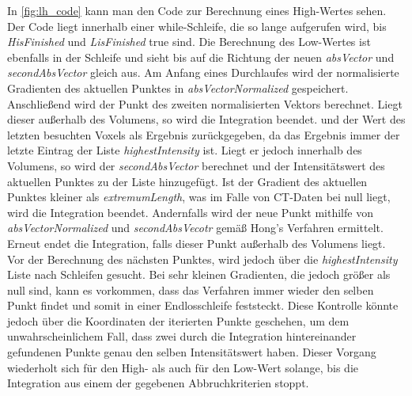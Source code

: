 In \autoref{fig:lh_code} kann man den Code zur Berechnung eines High-Wertes sehen. Der Code liegt innerhalb einer while-Schleife, die so lange aufgerufen wird, bis \textit{HisFinished} und \textit{LisFinished} true sind. Die Berechnung des Low-Wertes ist ebenfalls in der Schleife und sieht bis auf die Richtung der neuen \textit{absVector} und \textit{secondAbsVector} gleich aus.
\newline
Am Anfang eines Durchlaufes wird der normalisierte Gradienten des aktuellen Punktes in \textit{absVectorNormalized} gespeichert. Anschließend wird der Punkt des zweiten normalisierten Vektors berechnet. Liegt dieser außerhalb des Volumens, so wird die Integration beendet. und der Wert des letzten besuchten Voxels als Ergebnis zurückgegeben, da das Ergebnis immer der letzte Eintrag der Liste \textit{highestIntensity} ist. Liegt er jedoch innerhalb des Volumens, so wird der \textit{secondAbsVector} berechnet und der Intensitätswert des aktuellen Punktes zu der Liste hinzugefügt. Ist der Gradient des aktuellen Punktes kleiner als \textit{extremumLength}, was im Falle von CT-Daten bei null liegt, wird die Integration beendet. Andernfalls wird der neue Punkt mithilfe von \textit{absVectorNormalized} und \textit{secondAbsVecotr} gemäß Hong's Verfahren \cite{} ermittelt. Erneut endet die Integration, falls dieser Punkt außerhalb des Volumens liegt. Vor der Berechnung des nächsten Punktes, wird jedoch über die \textit{highestIntensity} Liste nach Schleifen gesucht. Bei sehr kleinen Gradienten, die jedoch größer als null sind, kann es vorkommen, dass das Verfahren immer wieder den selben Punkt findet und somit in einer Endlosschleife feststeckt. Diese Kontrolle könnte jedoch über die Koordinaten der iterierten Punkte geschehen, um dem unwahrscheinlichem Fall, dass zwei durch die Integration hintereinander gefundenen Punkte genau den selben Intensitätswert haben.
\newline
Dieser Vorgang wiederholt sich für den High- als auch für den Low-Wert solange, bis die Integration aus einem der gegebenen Abbruchkriterien stoppt.